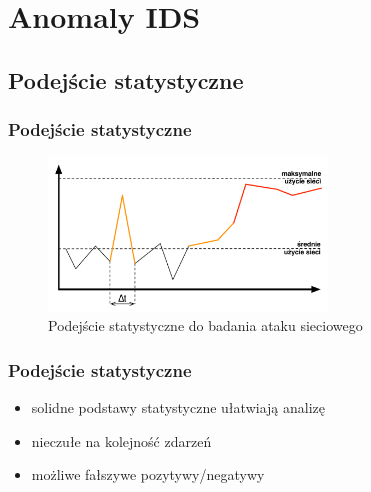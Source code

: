 \documentclass{beamer}
\begin{document}
\section{Anomaly IDS}

\subsection{Podejście statystyczne}
\begin{frame}
  \frametitle{Podejście statystyczne}
    \begin{figure}
      \includegraphics[width=20em]{network_usage.pdf}
      \caption{Podejście statystyczne do badania ataku sieciowego}
    \end{figure}
\end{frame}
\begin{frame}
  \frametitle{Podejście statystyczne}
  \begin{itemize}
    \item solidne podstawy statystyczne ułatwiają analizę
    \item nieczułe na kolejność zdarzeń
    \item możliwe fałszywe pozytywy/negatywy
  \end{itemize}
\end{frame}
\end{document}
